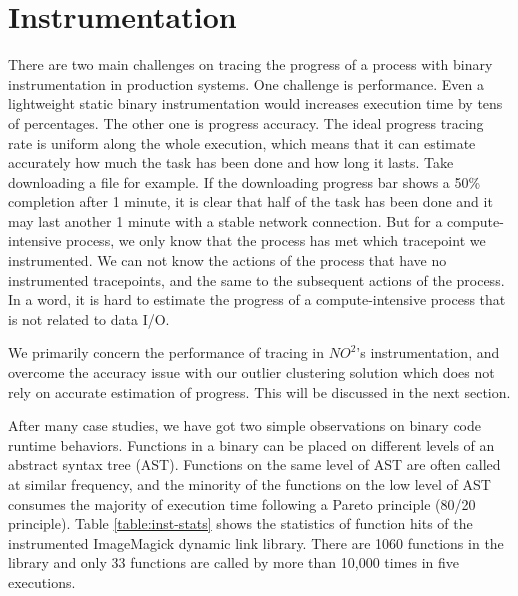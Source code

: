 \section{Instrumentation}

There are two main challenges on tracing the progress of a process with binary instrumentation
in production systems. One challenge is performance. Even a lightweight static binary
instrumentation would increases execution time by tens of percentages. The other one is
progress accuracy. The ideal progress tracing rate is uniform along the whole execution, which
means that it can estimate accurately how much the task has been done and how long it
lasts. Take downloading a file for example. If the downloading progress bar shows a
50\% completion after 1 minute, it is clear that half of the task has been done and it may
last another 1 minute with a stable network connection. But for a compute-intensive
process, we only know that the process has met which tracepoint we instrumented. We can
not know the actions of the process that have no instrumented tracepoints, and the same
to the subsequent actions of the process. In a word, it is hard to estimate the progress of a compute-intensive
process that is not related to data I/O.

We primarily concern the performance of tracing in $NO^2$'s instrumentation, and 
overcome the accuracy issue with our outlier clustering solution which does not rely on
accurate estimation of progress. This will be discussed in the next section.

After many case studies, we have got two simple observations on binary code runtime
behaviors. Functions in a binary can be placed on different levels of an abstract syntax
tree (AST). Functions on the same level of AST are often called at similar frequency, and
the minority of the functions on the low level of AST consumes the majority of execution time
following a Pareto principle (80/20 principle). Table \ref{table:inst-stats} shows
the statistics of function hits of the instrumented ImageMagick dynamic link library.
There are 1060 functions in the library and only 33 functions are called by more than 10,000
times in five executions.

